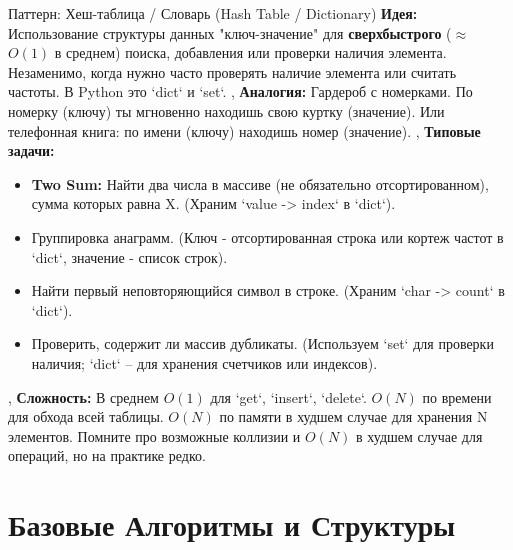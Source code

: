 \begin{textbox}{Паттерн: Хеш-таблица / Словарь (Hash Table / Dictionary)}
    \textbf{Идея:} Использование структуры данных "ключ-значение" для \textbf{сверхбыстрого} ($\approx$ $O(1)$ в среднем) поиска, добавления или проверки наличия элемента. Незаменимо, когда нужно часто проверять наличие элемента или считать частоты. В Python это `dict` и `set`. \sep
    \textbf{Аналогия:} Гардероб с номерками. По номерку (ключу) ты мгновенно находишь свою куртку (значение). Или телефонная книга: по имени (ключу) находишь номер (значение). \sep
    \textbf{Типовые задачи:}
    \begin{itemize}[nosep, leftmargin=*]
        \item \textbf{Two Sum:} Найти два числа в массиве (не обязательно отсортированном), сумма которых равна X. (Храним `value -> index` в `dict`).
        \item Группировка анаграмм. (Ключ - отсортированная строка или кортеж частот в `dict`, значение - список строк).
        \item Найти первый неповторяющийся символ в строке. (Храним `char -> count` в `dict`).
        \item Проверить, содержит ли массив дубликаты. (Используем `set` для проверки наличия; `dict` – для хранения счетчиков или индексов).
    \end{itemize} \sep
    \textbf{Сложность:} В среднем \textbf{$O(1)$} для `get`, `insert`, `delete`. \textbf{$O(N)$} по времени для обхода всей таблицы. \textbf{$O(N)$} по памяти в худшем случае для хранения N элементов. Помните про возможные коллизии и $O(N)$ в худшем случае для операций, но на практике редко.
\end{textbox}

\section{Базовые Алгоритмы и Структуры}

